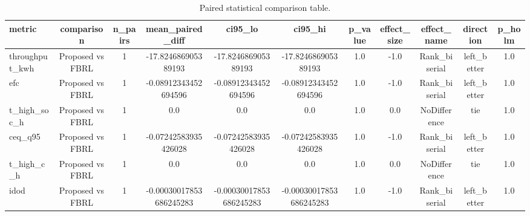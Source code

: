\begin{table}[t]
\centering
\caption{Paired statistical comparison table.}
\label{tab:stats_auto}
\begin{tabular}{lcccccccccc}
\toprule
metric & comparison & n\_pairs & mean\_paired\_diff & ci95\_lo & ci95\_hi & p\_value & effect\_size & effect\_name & direction & p\_holm \\
\midrule
throughput\_kwh & Proposed vs FBRL & 1 & -17.824686905389193 & -17.824686905389193 & -17.824686905389193 & 1.0 & -1.0 & Rank\_biserial & left\_better & 1.0 \\
efc & Proposed vs FBRL & 1 & -0.08912343452694596 & -0.08912343452694596 & -0.08912343452694596 & 1.0 & -1.0 & Rank\_biserial & left\_better & 1.0 \\
t\_high\_soc\_h & Proposed vs FBRL & 1 & 0.0 & 0.0 & 0.0 & 1.0 & 0.0 & NoDifference & tie & 1.0 \\
ceq\_q95 & Proposed vs FBRL & 1 & -0.07242583935426028 & -0.07242583935426028 & -0.07242583935426028 & 1.0 & -1.0 & Rank\_biserial & left\_better & 1.0 \\
t\_high\_c\_h & Proposed vs FBRL & 1 & 0.0 & 0.0 & 0.0 & 1.0 & 0.0 & NoDifference & tie & 1.0 \\
idod & Proposed vs FBRL & 1 & -0.00030017853686245283 & -0.00030017853686245283 & -0.00030017853686245283 & 1.0 & -1.0 & Rank\_biserial & left\_better & 1.0 \\
\bottomrule
\end{tabular}
\end{table}